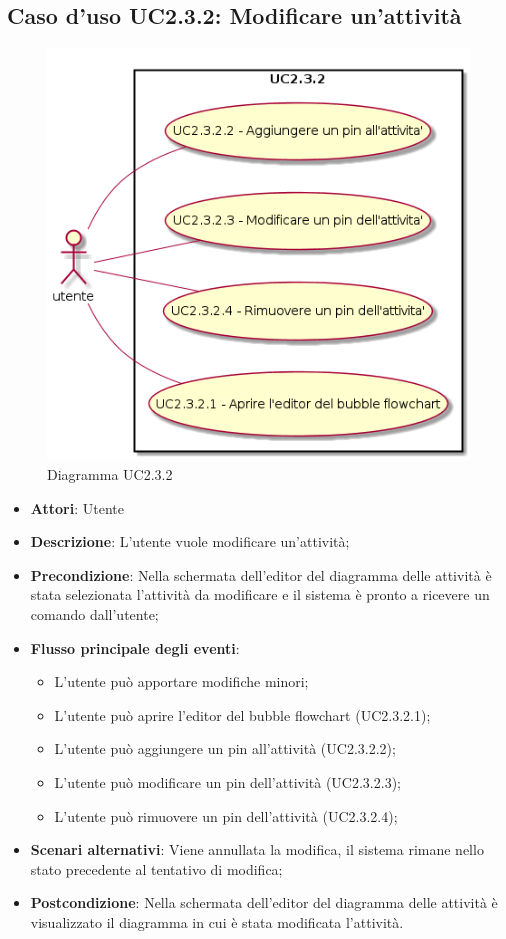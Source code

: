 \documentclass[../AnalisiDeiRequisiti.tex]{subfiles}
\begin{document}
				\subsection{Caso d'uso UC2.3.2: Modificare un'attività}
				\begin{figure} [H]
					\centering
					\includegraphics[scale=0.45]{./Figures/UC2-3-2.png}
					\caption{Diagramma UC2.3.2}\label{}
				\end{figure}
				\begin{itemize}
					\item \textbf{Attori}: Utente
					\item \textbf{Descrizione}: L'utente vuole modificare un'attività;
					\item \textbf{Precondizione}: Nella schermata dell'editor del diagramma delle attività è stata selezionata l'attività da modificare e il sistema è pronto a ricevere un comando dall'utente;
					\item \textbf{Flusso principale degli eventi}: \begin{itemize}
						\item L'utente può apportare modifiche minori;
						\item L'utente può aprire l'editor del bubble flowchart (UC2.3.2.1);
						\item L'utente può aggiungere un pin all'attività (UC2.3.2.2);
						\item L'utente può modificare un pin dell'attività (UC2.3.2.3);
						\item L'utente può rimuovere un pin dell'attività (UC2.3.2.4);
					\end{itemize}
					\item \textbf{Scenari alternativi}: Viene annullata la modifica, il sistema rimane nello stato precedente al tentativo di modifica;
					\item \textbf{Postcondizione}: Nella schermata dell'editor del diagramma delle attività è visualizzato il diagramma in cui è stata modificata l'attività.
				\end{itemize}
\end{document}

